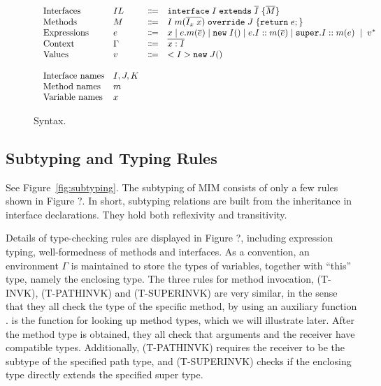 \begin{figure*}[htbp]
\begin{displaymath}
\begin{array}{l}
\begin{array}{llrl}
\text{Interfaces}   & IL & \Coloneqq & \texttt{interface} \; I \; \texttt{extends} \; \overline{I} \; {\{} \overline{M} {\}} \\
\text{Methods}      & M  & \Coloneqq & I \; m (\overline{I_x \; x}) \; \texttt{override} \; J \; {\{} \texttt{return} \; e ; {\}} \\
\text{Expressions}  & e  & \Coloneqq & x \mid
e.m(\overline{e}) \mid
\texttt{new} \; I() \mid
e.I::m(\overline{e}) \mid
\texttt{super}.I::m(e) \; \mid \; v^* \\
\text{Context}      & \Gamma & \Coloneqq & \overline{x:I} \\
\text{Values}       & v & \Coloneqq & <I>\texttt{new} \; J() \\
\\
\text{Interface names} & I, J, K & & \\
\text{Method names} & m & & \\
\text{Variable names} & x & &
\end{array}
\end{array}
\end{displaymath}
\caption{Syntax. }\label{fig:syntax}
\end{figure*}

\subsection{Subtyping and Typing Rules}
See Figure~\ref{fig:subtyping}. 
The subtyping of MIM consists of only a few rules shown in Figure ?.
In short, subtyping relations are built from the inheritance in interface
declarations. They hold both reflexivity and transitivity.

Details of type-checking rules are displayed in Figure ?, including expression
typing, well-formedness of methods and interfaces. As a convention, an environment
$\Gamma$ is maintained to store the types of variables, together with ``this'' type, namely
the enclosing type. The three rules for method invocation, (T-INVK), (T-PATHINVK) and (T-SUPERINVK)
are very similar, in the sense that they all check the type of the specific method, by using
an auxiliary function \mtype. \mtype is the function for looking up method types, which we will
illustrate later. After the method type is obtained, they all check that arguments and the receiver
have compatible types. Additionally, (T-PATHINVK) requires the receiver to be the subtype of the specified
path type, and (T-SUPERINVK) checks if the enclosing type directly extends the specified super type.

